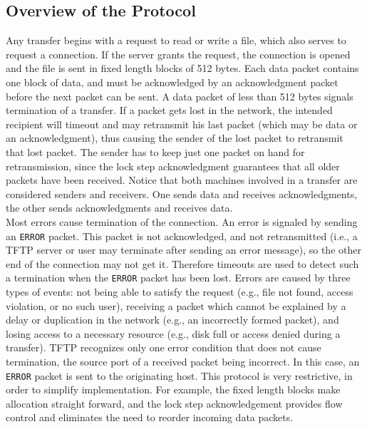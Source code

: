 \documentclass[12pt]{article}
\begin{document}
\subsection{Overview of the Protocol}
Any transfer begins with a request to read or write a file, which also serves to request a connection. If the server grants the request, the connection is opened and the file is sent in fixed length blocks of 512 bytes.  Each data packet contains one block of data, and must be acknowledged by an acknowledgment packet before the next packet can be sent. A data packet of less than 512 bytes signals termination of a transfer. If a packet gets lost in the network, the intended recipient will timeout and may retransmit his last packet (which may be data or an acknowledgment), thus causing the sender of the lost packet to retransmit that lost packet. The sender has to keep just one packet on hand for retransmission, since the lock step acknowledgment guarantees that all older packets have been received. Notice that both machines involved in a transfer are considered senders and receivers. One sends data and receives acknowledgments, the other sends acknowledgments and receives data.\\
Most errors cause termination of the connection. An error is signaled by sending an \verb|ERROR| packet. This packet is not acknowledged, and not retransmitted (i.e., a TFTP server or user may terminate after sending an   error message), so the other end of the connection may not get it. Therefore timeouts are used to detect such a termination when the \verb|ERROR| packet has been lost. Errors are caused by three types of events: not being able to satisfy the request (e.g., file not found, access violation, or no such user), receiving a packet which cannot be explained by a delay or duplication in the network (e.g., an incorrectly formed packet), and losing access to a necessary resource (e.g., disk full or access denied during a transfer). TFTP recognizes only one error condition that does not cause termination, the source port of a received packet being incorrect. In this case, an \verb|ERROR| packet is sent to the originating host. This protocol is very restrictive, in order to simplify implementation. For example, the fixed length blocks make allocation straight forward, and the lock step acknowledgement provides flow control and eliminates the need to reorder incoming data packets.
\end{document}
